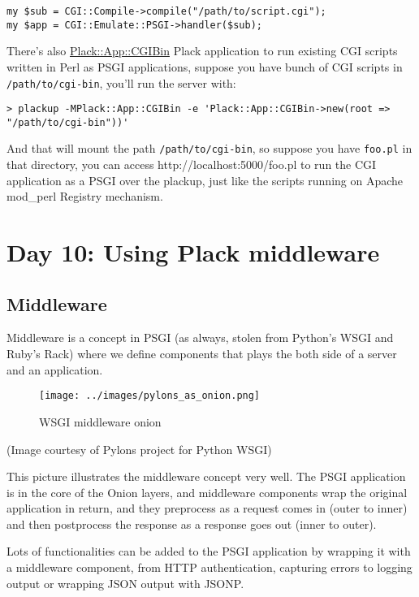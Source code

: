 \begin{lstlisting}
my $sub = CGI::Compile->compile("/path/to/script.cgi");
my $app = CGI::Emulate::PSGI->handler($sub);
\end{lstlisting}

There's also
\href{http://search.cpan.org/perldoc?Plack::App::CGIBin}{Plack::App::CGIBin}
Plack application to run existing CGI scripts written in Perl as PSGI
applications, suppose you have bunch of CGI scripts in
\lstinline!/path/to/cgi-bin!, you'll run the server with:

\begin{lstlisting}
> plackup -MPlack::App::CGIBin -e 'Plack::App::CGIBin->new(root => "/path/to/cgi-bin"))'
\end{lstlisting}

And that will mount the path \lstinline!/path/to/cgi-bin!, so suppose
you have \lstinline!foo.pl! in that directory, you can access
http://localhost:5000/foo.pl to run the CGI application as a PSGI over
the plackup, just like the scripts running on Apache mod\_perl Registry
mechanism.

\section{Day 10: Using Plack
middleware}\label{day-10-using-plack-middleware}

\subsection{Middleware}\label{middleware}

Middleware is a concept in PSGI (as always, stolen from Python's WSGI
and Ruby's Rack) where we define components that plays the both side of
a server and an application.

\begin{figure}[htbp]
\centering
\texttt{[image: ../images/pylons\_as\_onion.png]}
\caption{WSGI middleware onion}
\end{figure}

(Image courtesy of Pylons project for Python WSGI)

This picture illustrates the middleware concept very well. The PSGI
application is in the core of the Onion layers, and middleware
components wrap the original application in return, and they preprocess
as a request comes in (outer to inner) and then postprocess the response
as a response goes out (inner to outer).

Lots of functionalities can be added to the PSGI application by wrapping
it with a middleware component, from HTTP authentication, capturing
errors to logging output or wrapping JSON output with JSONP.

